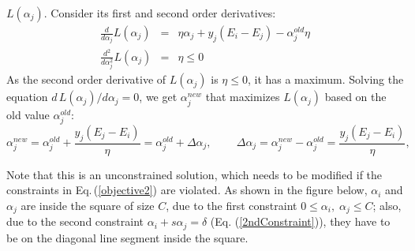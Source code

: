 \documentclass{article}
\begin{document}
$L(\alpha_j)$. Consider its first and second order derivatives:
\begin{eqnarray}
  \frac{d}{d\alpha_j}L(\alpha_j)&=&\eta\alpha_j+y_j(E_i-E_j)-\alpha_j^{old}\eta
  \nonumber\\
  \frac{d^2}{d\alpha_j^2}L(\alpha_j)&=&\eta\le 0
\end{eqnarray}
As the second order derivative of $L(\alpha_j)$ is $\eta\le 0$, it 
has a maximum. Solving the equation $d\,L(\alpha_j)/d\alpha_j=0$, we 
get $\alpha_j^{new}$ that maximizes $L(\alpha_j)$ based on the old 
value $\alpha_j^{old}$:
\begin{equation}
  \alpha_j^{new}=\alpha_j^{old}+\frac{y_j(E_j-E_i)}{\eta}
  =\alpha_j^{old}+\Delta\alpha_j,
  \;\;\;\;\;\;\;\;
  \Delta\alpha_j=\alpha_j^{new}-\alpha_j^{old}=\frac{y_j(E_j-E_i)}{\eta},
\end{equation}

Note that this is an unconstrained solution, which needs to be modified
if the constraints in Eq.\,(\ref{objective2}) are violated. As shown in
the figure below, $\alpha_i$ and $\alpha_j$ are inside the square of 
size $C$, due to the first constraint $0\le \alpha_i,\;\alpha_j\le C$;
also, due to the second constraint $\alpha_i+s\alpha_j=\delta$
(Eq. (\ref{2ndConstraint})), they have to be on the diagonal line
segment inside the square.

\end{document}
